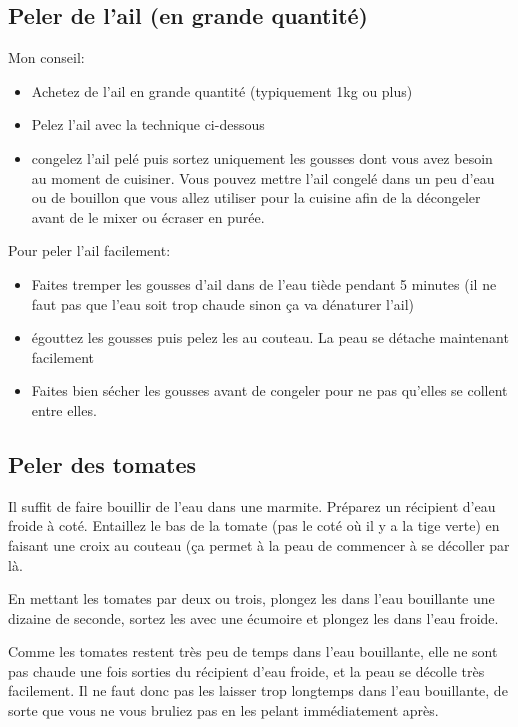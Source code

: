 \documentclass[a4paper,twoside,openright]{report}
\begin{document}
\subsection{Peler de l'ail (en grande quantité)}\label{sec:peler_ail}

Mon conseil:
\begin{itemize}
\item Achetez de l'ail en grande quantité (typiquement 1kg ou plus)
\item Pelez l'ail avec la technique ci-dessous
\item congelez l'ail pelé puis sortez uniquement les gousses dont vous avez besoin au moment de cuisiner. Vous pouvez mettre l'ail congelé dans un peu d'eau ou de bouillon que vous allez utiliser pour la cuisine afin de la décongeler avant de le mixer ou écraser en purée. 
\end{itemize}

Pour peler l'ail facilement:
\begin{itemize}
\item Faites tremper les gousses d'ail dans de l'eau tiède pendant 5 minutes (il ne faut pas que l'eau soit trop chaude sinon ça va dénaturer l'ail)
\item égouttez les gousses puis pelez les au couteau. La peau se détache maintenant facilement
\item Faites bien sécher les gousses avant de congeler pour ne pas qu'elles se collent entre elles. 
\end{itemize}

\subsection{Peler des tomates}\label{sec:peler_tomate}
Il suffit de faire bouillir de l'eau dans une marmite. Préparez un récipient d'eau froide à coté.
Entaillez le bas de la tomate (pas le coté où il y a la tige verte) en faisant une croix au couteau (ça permet à la peau de commencer à se décoller par là. 

En mettant les tomates par deux ou trois, plongez les dans l'eau bouillante une dizaine de seconde, sortez les avec une écumoire et plongez les dans l'eau froide. 

\begin{remarque}
Comme les tomates restent très peu de temps dans l'eau bouillante, elle ne sont pas chaude une fois sorties du récipient d'eau froide, et la peau se décolle très facilement. Il ne faut donc pas les laisser trop longtemps dans l'eau bouillante, de sorte que vous ne vous bruliez pas en les pelant immédiatement après.
\end{remarque}
\end{document}
